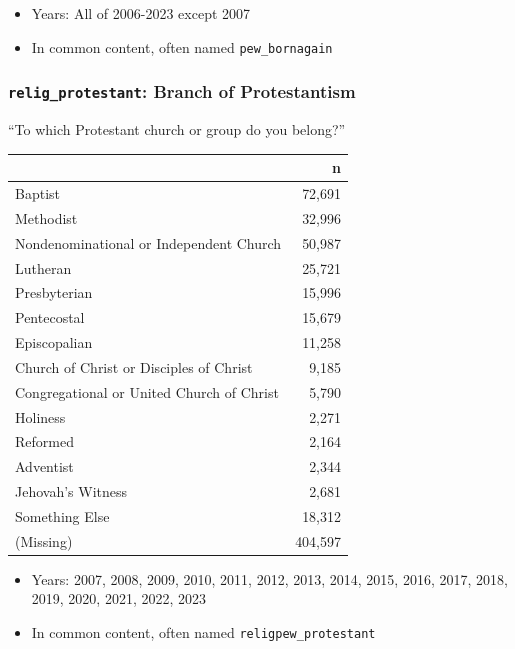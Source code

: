 \documentclass[10pt,article,oneside]{memoir}
\theoremstyle{definition}
\begin{document}
\begin{itemize}
\tightlist
\item
  Years: All of 2006-2023 except 2007
\item
  In common content, often named \texttt{pew\_bornagain}
\end{itemize}

\subsubsection{\texorpdfstring{\texttt{relig\_protestant}: Branch of
Protestantism}{relig\_protestant: Branch of Protestantism}}\label{relig_protestant-branch-of-protestantism}

``To which Protestant church or group do you belong?''

\begin{table}[H]
\centering
\begin{tabular}[t]{lr}
\toprule
 & n\\
\midrule
Baptist & 72,691\\
Methodist & 32,996\\
Nondenominational or Independent Church & 50,987\\
Lutheran & 25,721\\
Presbyterian & 15,996\\
Pentecostal & 15,679\\
Episcopalian & 11,258\\
Church of Christ or Disciples of Christ & 9,185\\
Congregational or United Church of Christ & 5,790\\
Holiness & 2,271\\
Reformed & 2,164\\
Adventist & 2,344\\
Jehovah's Witness & 2,681\\
Something Else & 18,312\\
(Missing) & 404,597\\
\bottomrule
\end{tabular}
\end{table}

\begin{itemize}
\tightlist
\item
  Years: 2007, 2008, 2009, 2010, 2011, 2012, 2013, 2014, 2015, 2016,
  2017, 2018, 2019, 2020, 2021, 2022, 2023
\item
  In common content, often named \texttt{religpew\_protestant}
\end{itemize}
\end{document}
